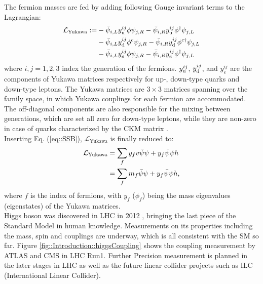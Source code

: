 The fermion masses are fed by adding following Gauge invariant terms to the Lagrangian:
\begin{align}
\mathcal{L}_\mathrm{Yukawa} := 
& -\bar{\psi}_{i,L} y_{\mathrm{u}}^{ij} \phi   \psi_{j,R} -\bar{\psi}_{i,R} y_{\mathrm{u}}^{ij} \phi^\dagger     \psi_{j,L} \nonumber \\
& -\bar{\psi}_{i,L} y_{\mathrm{d}}^{ij} \phi^c \psi_{j,R} -\bar{\psi}_{i,R} y_{\mathrm{d}}^{ij} \phi^{c \dagger} \psi_{j,L} \nonumber \\
& -\bar{\psi}_{i,L} y_e^{ij} \phi   \psi_{j,R} -\bar{\psi}_{i,R} y_e^{ij} \phi^\dagger     \psi_{j,L} 
\label{SMLagYukawa}
\end{align}
where $i, j = 1, 2, 3$ index the generation of the fermions.
$y_{\mathrm{u}}^{ij}$, $y_{\mathrm{d}}^{ij}$, and $y_e^{ij}$ are the components of Yukawa matrices respectively for up-, down-type quarks and down-type leptons. 
The Yukawa matrices are $3\times 3$ matrices spanning over the family space, in which Yukawa couplings for each fermion are accommodated.
The off-diagonal components are also responsible for the mixing between generations, 
which are set all zero for down-type leptons, 
while they are non-zero in case of quarks characterized by the CKM matrix \cite{CPVKM}. \\ 

Inserting Eq. (\ref{eq::SSB}), $\mathcal{L}_{\mathrm{Yukawa}}$ is finally reduced to:
\begin{align}
\mathcal{L}_{\mathrm{Yukawa}} & = \sum_f y_f v \bar{\psi} \psi + y_f \bar{\psi}{\psi} h \nonumber \\
& = \sum_f m_f \bar{\psi} \psi + y_f \bar{\psi}{\psi} h,
\end{align}
where $f$ is the index of fermions, with $y_f$ ($\phi_f$) being the mass eigenvalues (eigenstates) of the Yukawa matrices. \\

Higgs boson was discovered in LHC in 2012 \cite{HiggsDiscATLAS,HiggsDiscCMS}, bringing the last piece of the Standard Model in human knowledge. Measurements on its properties including the mass, spin \cite{HiggsSpinATLAS,HiggsSpinCMS} and couplings \cite{ATLASHiggsCouplingRun1,CMSHiggsCouplingRun1} are underway, which is all consistent with the SM so far. Figure \ref{fig::Introduction::higgsCoupling} shows the coupling measurement by ATLAS and CMS in LHC Run1. Further Precision measurement is planned in the later stages in LHC as well as the future linear collider projects such as ILC (International Linear Collider).

